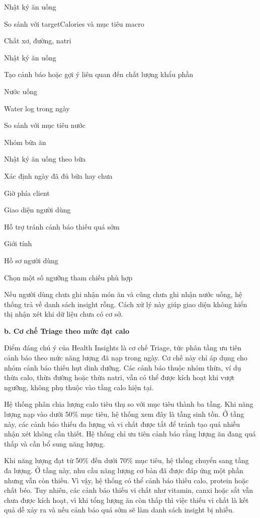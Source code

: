 \documentclass[12pt, a4paper]{report}
\begin{document}
Nhật ký ăn uống

So sánh với targetCalories và mục tiêu macro

Chất xơ, đường, natri

Nhật ký ăn uống

Tạo cảnh báo hoặc gợi ý liên quan đến chất lượng khẩu phần

Nước uống

Water log trong ngày

So sánh với mục tiêu nước

Nhóm bữa ăn

Nhật ký ăn uống theo bữa

Xác định ngày đã đủ bữa hay chưa

Giờ phía client

Giao diện người dùng

Hỗ trợ tránh cảnh báo thiếu quá sớm

Giới tính

Hồ sơ người dùng

Chọn một số ngưỡng tham chiếu phù hợp

Nếu người dùng chưa ghi nhận món ăn và cũng chưa ghi nhận nước uống, hệ thống trả về danh sách insight rỗng. Cách xử lý này giúp giao diện không hiển thị nhận xét khi dữ liệu chưa có cơ sở.

\textbf{b. Cơ chế Triage theo mức đạt calo}

Điểm đáng chú ý của Health Insights là cơ chế Triage, tức phân tầng ưu tiên cảnh báo theo mức năng lượng đã nạp trong ngày. Cơ chế này chỉ áp dụng cho nhóm cảnh báo thiếu hụt dinh dưỡng. Các cảnh báo thuộc nhóm thừa, ví dụ thừa calo, thừa đường hoặc thừa natri, vẫn có thể được kích hoạt khi vượt ngưỡng, không phụ thuộc vào tầng calo hiện tại.

Hệ thống phân chia lượng calo tiêu thụ so với mục tiêu thành ba tầng. Khi năng lượng nạp vào dưới 50\% mục tiêu, hệ thống xem đây là tầng sinh tồn. Ở tầng này, các cảnh báo thiếu đa lượng và vi chất được tắt để tránh tạo quá nhiều nhận xét không cần thiết. Hệ thống chỉ ưu tiên cảnh báo rằng lượng ăn đang quá thấp và cần bổ sung năng lượng.

Khi năng lượng đạt từ 50\% đến dưới 70\% mục tiêu, hệ thống chuyển sang tầng đa lượng. Ở tầng này, nhu cầu năng lượng cơ bản đã được đáp ứng một phần nhưng vẫn còn thiếu. Vì vậy, hệ thống có thể cảnh báo thiếu calo, protein hoặc chất béo. Tuy nhiên, các cảnh báo thiếu vi chất như vitamin, canxi hoặc sắt vẫn chưa được kích hoạt, vì khi tổng lượng ăn còn thấp thì việc thiếu vi chất là kết quả dễ xảy ra và nếu cảnh báo quá sớm sẽ làm danh sách insight bị nhiễu.
\end{document}
